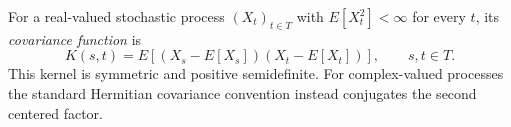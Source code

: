 
For a real-valued stochastic process $(X_t)_{t\in T}$ with $E[X_t^2]<\infty$ for every $t$, its \emph{covariance function} is
\[
K(s,t)=E\!\left[(X_s-E[X_s])(X_t-E[X_t])\right],\qquad s,t\in T.
\]
This kernel is symmetric and positive semidefinite. For complex-valued processes the standard Hermitian covariance convention instead conjugates the second centered factor.
